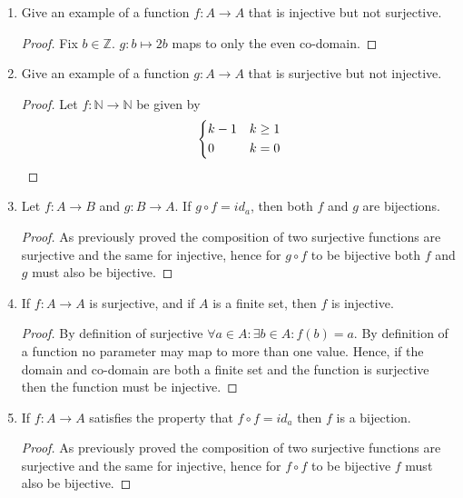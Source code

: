 \documentclass{article}
\begin{document}
\begin{enumerate}
\begin{proof}
    \end{proof}
  \item Give an example of a function $f : A\to A$ that is injective but not surjective.
    \begin{proof}
      Fix $b\in \mathbb{Z}$. $g : b\mapsto 2b$ maps to only the even co-domain.
    \end{proof}
  \item Give an example of a function $g : A\to A$ that is surjective but not injective. 
    \begin{proof}
      Let $f: \mathbb{N} \to \mathbb{N}$ be given by
        $$
        \begin{dcases}
          k-1 & k \geq 1 \\
          0 & k = 0
        \end{dcases}
       $$
     \end{proof}
  \item Let $f : A\to B$ and $g : B\to A$. If $g \circ f = id_{a}$, then both $f$ and $g$ are bijections.
   \begin{proof}
      As previously proved the composition of two surjective functions are surjective and the same for injective, hence for $g \circ f$ to be bijective both $f$ and $g$ must also be bijective.
    \end{proof}
  \item If $f : A\to A$ is surjective, and if $A$ is a finite set, then $f$ is injective.
    \begin{proof}
By definition of surjective $\forall a\in A: \exists b\in A: f(b) = a$. By definition of a function no parameter may map to more than one value. Hence, if the domain and co-domain are both a finite set and the function is surjective then the function must be injective.
    \end{proof}
  \item If $f : A\to A$ satisfies the property that $f \circ f = id_{a}$ then $f$ is a bijection.
    \begin{proof}
      As previously proved the composition of two surjective functions are surjective and the same for injective, hence for $f \circ f$ to be bijective $f$ must also be bijective.
    \end{proof}
  \end{enumerate}
\end{document}

